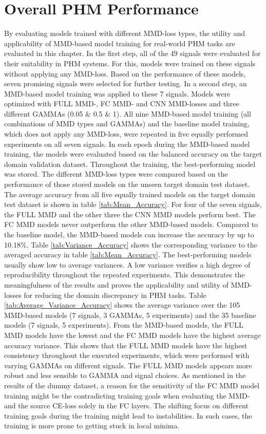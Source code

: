 \section{Overall PHM Performance}\label{ch:PHM_performance}
By evaluating models trained with different MMD-loss types, the utility and applicability of MMD-based model training for real-world PHM tasks are evaluated in this chapter. In the first step, all of the 49 signals were evaluated for their suitability in PHM systems. For this, models were trained on these signals without applying any MMD-loss. Based on the performance of these models, seven promising signals were selected for further testing. In a second step, an MMD-based model training was applied to these 7 signals. Models were optimized with FULL MMD-, FC MMD- and CNN MMD-losses and three different GAMMAs (0.05 $\&$ 0.5 $\&$ 1). All nine MMD-based model training (all combinations of MMD types and GAMMAs) and the baseline model training, which does not apply any MMD-loss, were repeated in five equally performed experiments on all seven signals. In each epoch during the MMD-based model training, the models were evaluated based on the balanced accuracy on the target domain validation dataset. Throughout the training, the best-performing model was stored. The different MMD-loss types were compared based on the performance of those stored models on the unseen target domain test dataset. The average accuracy from all five equally trained models on the target domain test dataset is shown in table \ref{tab:Mean_Accuracy}. For four of the seven signals, the FULL MMD and the other three the CNN MMD models perform best. The FC MMD models never outperform the other MMD-based models. Compared to the baseline model, the MMD-based models can increase the accuracy by up to 10.18$\%$. Table \ref{tab:Variance_Accuracy} shows the corresponding variance to the averaged accuracy in table \ref{tab:Mean_Accuracy}. The best-performing models usually show low to average variances. A low variance verifies a high degree of reproducibility throughout the repeated experiments. This demonstrates the meaningfulness of the results and proves the applicability and utility of MMD-losses for reducing the domain discrepancy in PHM tasks. Table \ref{tab:Average_Variance_Accuracy} shows the average variance over the 105 MMD-based models (7 signals, 3 GAMMAs, 5 experiments) and the 35 baseline models (7 signals, 5 experiments). From the MMD-based models, the FULL MMD models have the lowest and the FC MMD models have the highest average accuracy variance. This shows that the FULL MMD models have the highest consistency throughout the executed experiments, which were performed with varying GAMMAs on different signals. The FULL MMD models appears more robust and less sensible to GAMMA and signal choices. As mentioned in the results of the dummy dataset, a reason for the sensitivity of the FC MMD model training might be the contradicting training goals when evaluating the MMD- and the source CE-loss solely in the FC layers. The shifting focus on different training goals during the training might lead to instabilities. In such cases, the training is more prone to getting stuck in local minima.
